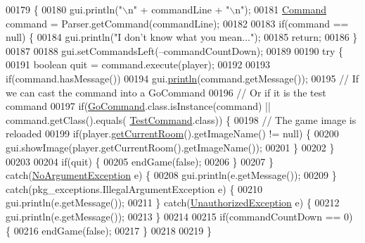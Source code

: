\begin{DoxyCode}
00179                                                    \{
00180         gui.println(\textcolor{stringliteral}{"\(\backslash\)n"} + commandLine + \textcolor{stringliteral}{"\(\backslash\)n"});
00181         \hyperlink{classpkg__commands_1_1Command}{Command} command = Parser.getCommand(commandLine);
00182 
00183         \textcolor{keywordflow}{if}(command == null) \{
00184             gui.println(\textcolor{stringliteral}{"I don't know what you mean..."});
00185             \textcolor{keywordflow}{return};
00186         \}
00187 
00188         gui.setCommandsLeft(--commandCountDown);
00189 
00190         \textcolor{keywordflow}{try} \{
00191             \textcolor{keywordtype}{boolean} quit = command.execute(player);
00192 
00193             \textcolor{keywordflow}{if}(command.hasMessage())
00194                 gui.\hyperlink{classUserInterface_a79f606b4b1f5d1523e50eea00039ed94}{println}(command.getMessage());
00195             \textcolor{comment}{// If we can cast the command into a GoCommand}
00196             \textcolor{comment}{// Or if it is the test command}
00197             \textcolor{keywordflow}{if}(\hyperlink{classpkg__commands_1_1GoCommand}{GoCommand}.class.isInstance(command) || command.getClass().equals(
      \hyperlink{classpkg__commands_1_1TestCommand}{TestCommand}.class)) \{
00198                 \textcolor{comment}{// The game image is reloaded}
00199                 \textcolor{keywordflow}{if}(player.\hyperlink{classpkg__world_1_1Player_a5ff0ede152d97c0c9cf6603c9a422a77}{getCurrentRoom}().getImageName() != null) \{
00200                     gui.showImage(player.getCurrentRoom().getImageName());
00201                 \}
00202             \}
00203 
00204             \textcolor{keywordflow}{if}(quit) \{
00205                 endGame(\textcolor{keyword}{false});
00206             \}
00207         \} \textcolor{keywordflow}{catch}(\hyperlink{classpkg__exceptions_1_1NoArgumentException}{NoArgumentException} e) \{
00208             gui.println(e.getMessage());
00209         \} \textcolor{keywordflow}{catch}(pkg\_exceptions.IllegalArgumentException e) \{
00210             gui.println(e.getMessage());
00211         \} \textcolor{keywordflow}{catch}(\hyperlink{classpkg__exceptions_1_1UnauthorizedException}{UnauthorizedException} e) \{
00212             gui.println(e.getMessage());
00213         \}
00214 
00215         \textcolor{keywordflow}{if}(commandCountDown == 0) \{
00216             endGame(\textcolor{keyword}{false});
00217         \}
00218 
00219     \}
\end{DoxyCode}


